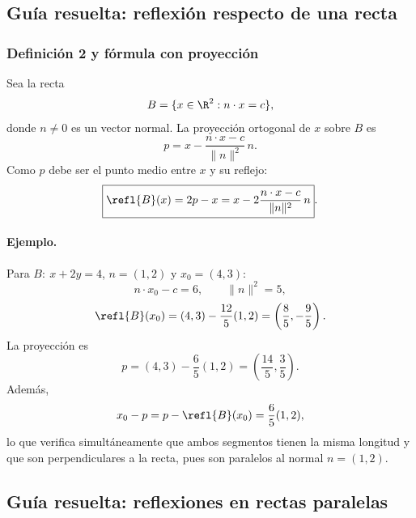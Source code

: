 \subsection{Guía resuelta: reflexión respecto de una recta}

\subsubsection{Definición 2 y fórmula con proyección}

Sea la recta
\[
  B=\{x\in\R^2:n\cdot x=c\},
\]
donde \(n\neq0\) es un vector normal. La proyección ortogonal de \(x\) sobre \(B\) es
\[
  p=x-\frac{n\cdot x-c}{\lVert n\rVert^2}\,n.
\]
Como \(p\) debe ser el punto medio entre \(x\) y su reflejo:
\[
  \boxed{\refl{B}(x)=2p-x
  =x-2\frac{n\cdot x-c}{\lVert n\rVert^2}\,n}.
\]

\begin{center}
\end{center}

\paragraph{Ejemplo.}
Para \(B:\ x+2y=4\), \(n=(1,2)\) y \(x_0=(4,3)\):
\[
  n\cdot x_0-c=6,\qquad \lVert n\rVert^2=5,
\]
\[
  \refl{B}(x_0)
  =(4,3)-\frac{12}{5}(1,2)
  =\left(\frac85,-\frac95\right).
\]
La proyección es
\[
  p=(4,3)-\frac65(1,2)
  =\left(\frac{14}{5},\frac35\right).
\]
Además,
\[
  x_0-p=p-\refl{B}(x_0)=\frac65(1,2),
\]
lo que verifica simultáneamente que ambos segmentos tienen la misma longitud y que son
perpendiculares a la recta, pues son paralelos al normal \(n=(1,2)\).

\subsection{Guía resuelta: reflexiones en rectas paralelas}

